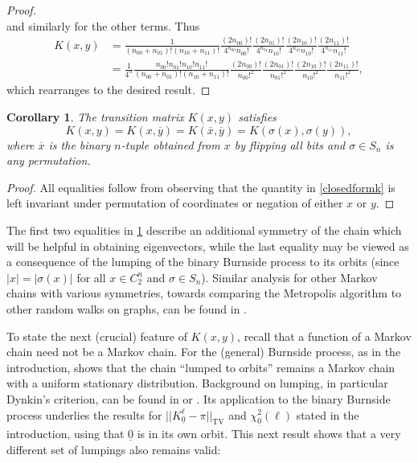 \documentclass[11pt]{article}
\newcounter{r}
\newcounter{s}
\numberwithin{equation}{section}
\newtheorem{corollary}[theorem]{Corollary}
\begin{document}
\begin{proof}
\[\]  
and similarly for the other terms. Thus
\begin{align*}
K(x, y) &= \frac{1}{(n_{00} + n_{01})! (n_{10} + n_{11})!}  \frac{(2n_{00})!}{4^{n_{00}} n_{00}!} \frac{(2n_{01})!}{4^{n_{01}} n_{10}!} \frac{(2n_{10})!}{4^{n_{10}} n_{10}!} \frac{(2n_{11})!}{4^{n_{11}} n_{11}!} \\
&= \frac{1}{4^n} \frac{n_{00}! n_{01}! n_{10}! n_{11}!}{(n_{00} + n_{01})! (n_{10} + n_{11})!} \frac{(2n_{00})!}{n_{00}!^2} \frac{(2n_{01})!}{n_{01}!^2} \frac{(2n_{10})!}{n_{10}!^2} \frac{(2n_{11})!}{n_{11}!^2},
\end{align*}
which rearranges to the desired result.
\end{proof}

\begin{corollary}\label{Kmatrixsymmetries}
The transition matrix $K(x, y)$ satisfies
\[
    K(x, y) = K(x, \overline{y}) = K(\overline{x}, \overline{y}) = K(\sigma(x), \sigma(y)),
\]  
where $\overline{x}$ is the binary $n$-tuple obtained from $x$ by flipping all bits and $\sigma \in S_n$ is any permutation.
\end{corollary}
\begin{proof}
All equalities follow from observing that the quantity in \cref{closedformk} is left invariant under permutation of coordinates or negation of either $x$ or $y$.
\end{proof}

The first two equalities in \cref{Kmatrixsymmetries} describe an additional symmetry of the chain which will be helpful in obtaining eigenvectors, while the last equality may be viewed as a consequence of the lumping of the binary Burnside process to its orbits (since $|x| = |\sigma(x)|$ for all $x \in C_2^n$ and $\sigma \in S_n$). Similar analysis for other Markov chains with various symmetries, towards comparing the Metropolis algorithm to other random walks on graphs, can be found in \cite{boydsymmetry}.

To state the next (crucial) feature of $K(x, y)$, recall that a function of a Markov chain need not be a Markov chain. For the (general) Burnside process, as in the introduction, \cite[Section3]{boseeinstein} shows that the chain ``lumped to orbits'' remains a Markov chain with a uniform stationary distribution. Background on lumping, in particular Dynkin's criterion, can be found in \cite{kemenysnell} or \cite{lumping}. Its application to the binary Burnside process underlies the results for $||K_{\underline{0}}^\ell - \pi||_{\text{TV}}$ and $\chi_{\underline{0}}^2(\ell)$ stated in the introduction, using that $\underline{0}$ is in its own orbit. This next result shows that a very different set of lumpings also remains valid:
\end{document}
